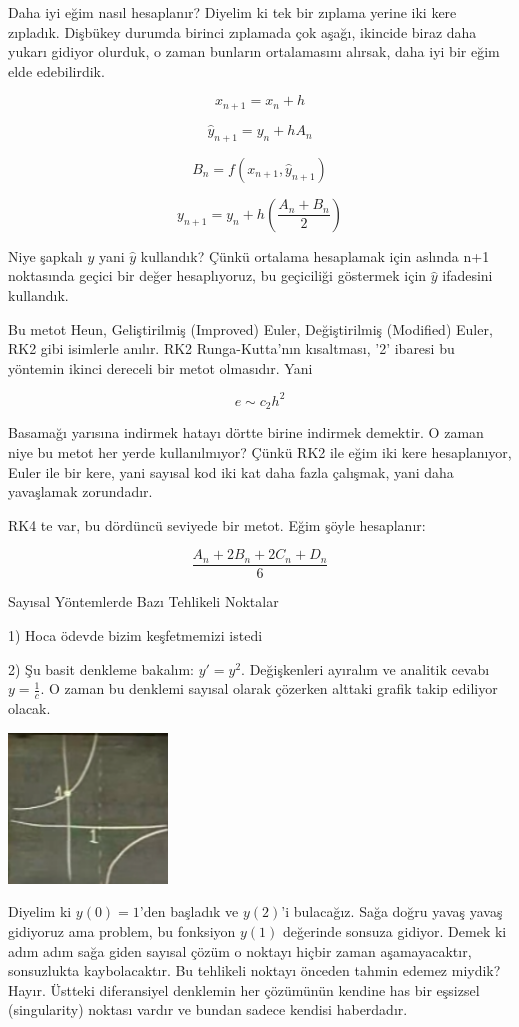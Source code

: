 \documentclass[12pt,fleqn]{article}\usepackage{../../common}
\begin{document}
Daha iyi eğim nasıl hesaplanır? Diyelim ki tek bir zıplama yerine iki kere
zıpladık. Dişbükey durumda birinci zıplamada çok aşağı, ikincide biraz daha
yukarı gidiyor olurduk, o zaman bunların ortalamasını alırsak, daha iyi bir eğim
elde edebilirdik. 

$$ x_{n+1} = x_n + h $$

$$ \hat{y}_{n+1} = y_n + h A_n $$

$$ B_n = f(x_{n+1},\hat{y}_{n+1}) $$

$$ y_{n+1} = y_n + h(\frac{A_n+B_n}{2}) $$

Niye şapkalı $y$ yani $\hat{y}$ kullandık? Çünkü ortalama hesaplamak için
aslında n+1 noktasında geçici bir değer hesaplıyoruz, bu geçiciliği göstermek
için $\hat{y}$ ifadesini kullandık.

Bu metot Heun, Geliştirilmiş (Improved) Euler, Değiştirilmiş (Modified)
Euler, RK2 gibi isimlerle anılır. RK2 Runga-Kutta'nın kısaltması, '2'
ibaresi bu yöntemin ikinci dereceli bir metot olmasıdır. Yani

$$ e \sim c_2 h^2 $$

Basamağı yarısına indirmek hatayı dörtte birine indirmek demektir. O zaman niye
bu metot her yerde kullanılmıyor? Çünkü RK2 ile eğim iki kere hesaplanıyor,
Euler ile bir kere, yani sayısal kod iki kat daha fazla çalışmak, yani daha
yavaşlamak zorundadır. 

RK4 te var, bu dördüncü seviyede bir metot. Eğim şöyle hesaplanır:

$$ \frac{A_n + 2B_n + 2C_n + D_n}{6} $$

Sayısal Yöntemlerde Bazı Tehlikeli Noktalar

1) Hoca ödevde bizim keşfetmemizi istedi

2) Şu basit denkleme bakalım: $y' = y^2$. Değişkenleri ayıralım ve analitik cevabı
$y=\frac{1}{c}$. O zaman bu denklemi sayısal olarak çözerken alttaki grafik
takip ediliyor olacak.

\includegraphics[height=4cm]{2_5.png}

Diyelim ki $y(0) = 1$'den başladık ve $y(2)$'i bulacağız. Sağa doğru yavaş yavaş
gidiyoruz ama problem, bu fonksiyon $y(1)$ değerinde sonsuza gidiyor. Demek ki
adım adım sağa giden sayısal çözüm o noktayı hiçbir zaman aşamayacaktır,
sonsuzlukta kaybolacaktır. Bu tehlikeli noktayı önceden tahmin edemez miydik?
Hayır. Üstteki diferansiyel denklemin her çözümünün kendine has bir eşsizsel
(singularity) noktası vardır ve bundan sadece kendisi haberdadır.
\end{document}
